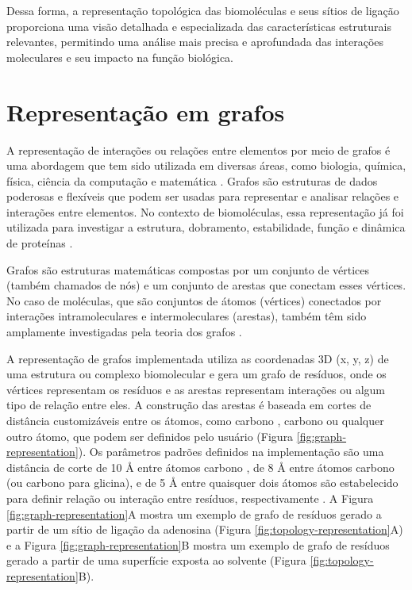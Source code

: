 \documentclass[Portugues]{phdquali}
\begin{document}
Dessa forma, a representação topológica das biomoléculas e seus sítios de ligação proporciona uma visão detalhada e especializada das características estruturais relevantes, permitindo uma análise mais precisa e aprofundada das interações moleculares e seu impacto na função biológica.

\section{Representação em grafos}


A representação de interações ou relações entre elementos por meio de grafos é uma abordagem que tem sido utilizada em diversas áreas, como biologia, química, física, ciência da computação e matemática \cite{foulds1995,majeed2020}. Grafos são estruturas de dados poderosas e flexíveis que podem ser usadas para representar e analisar relações e interações entre elementos. No contexto de biomoléculas, essa representação já foi utilizada para investigar a estrutura, dobramento, estabilidade, função e dinâmica de proteínas \cite{vishveshwara2002}.

Grafos são estruturas matemáticas compostas por um conjunto de vértices (também chamados de nós) e um conjunto de arestas que conectam esses vértices. No caso de moléculas, que são conjuntos de átomos (vértices) conectados por interações intramoleculares e intermoleculares (arestas), também têm sido amplamente investigadas pela teoria dos grafos \cite{vishveshwara2002,mason2007}.

A representação de grafos implementada utiliza as coordenadas 3D (x, y, z) de uma estrutura ou complexo biomolecular e gera um grafo de resíduos, onde os vértices representam os resíduos e as arestas representam interações ou algum tipo de relação entre eles. A construção das arestas é baseada em cortes de distância customizáveis entre os átomos, como carbono \textalpha, carbono \textbeta\space ou qualquer outro átomo, que podem ser definidos pelo usuário (Figura \ref{fig:graph-representation}). Os parâmetros padrões definidos na implementação são uma distância de corte de 10 Å entre átomos carbono \textalpha, de 8 Å entre átomos carbono \textbeta\space (ou carbono \textalpha\space para glicina), e de 5 Å entre quaisquer dois átomos são estabelecido para definir relação ou interação entre resíduos, respectivamente \cite{vishveshwara2002,mason2007}. A Figura \ref{fig:graph-representation}A mostra um exemplo de grafo de resíduos gerado a partir de um sítio de ligação da adenosina (Figura \ref{fig:topology-representation}A) e a Figura \ref{fig:graph-representation}B mostra um exemplo de grafo de resíduos gerado a partir de uma superfície exposta ao solvente (Figura \ref{fig:topology-representation}B).
\end{document}
